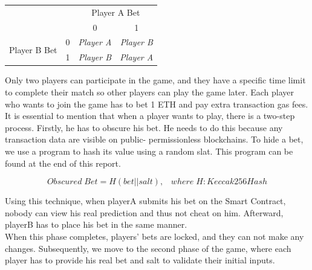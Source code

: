 \documentclass[12pt,a4paper]{article}
\begin{document}
\begin{table}[htpb]
    \begin{center}
        \begin{tabular}{lccc}
                                                              & \multicolumn{1}{l}{}   & \multicolumn{2}{c}{Player A Bet}                                                \\
                                                              &                        & 0                                      & 1                                      \\ \cline{3-4} 
            \multicolumn{1}{c}{\multirow{2}{*}{Player B Bet}} & \multicolumn{1}{c|}{0} & \multicolumn{1}{c|}{\textit{Player A}} & \multicolumn{1}{c|}{\textit{Player B}} \\ \cline{3-4} 
            \multicolumn{1}{c}{}                              & \multicolumn{1}{c|}{1} & \multicolumn{1}{c|}{\textit{Player B}} & \multicolumn{1}{c|}{\textit{Player A}} \\ \cline{3-4} 
        \end{tabular}
    \end{center}
\end{table}

Only two players can participate in the game, and they have a specific time limit to complete their match so other players can play the game later. Each player who wants to join the game has to bet 1 ETH and pay extra transaction gas fees.\\

It is essential to mention that when a player wants to play, there is a two-step process. Firstly, he has to obscure his bet. He needs to do this because any transaction data are visible on public- permissionless blockchains. To hide a bet, we use a program to hash its value using a random slat. This program can be found at the end of this report.

\begin{center}
    \[Obscured \; Bet = H( bet || salt ), \;\;\; where \; H: Keccak256Hash\]
\end{center}

Using this technique, when playerA submits his bet on the Smart Contract, nobody can view his real prediction and thus not cheat on him. Afterward, playerB has to place his bet in the same manner.\\

When this phase completes, players’ bets are locked, and they can not make any changes. Subsequently, we move to the second phase of the game, where each player has to provide his real bet and salt to validate their initial inputs.\\
\end{document}
